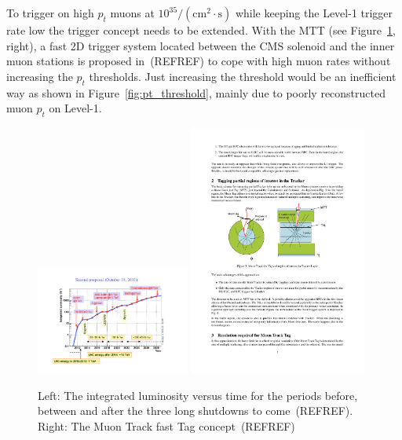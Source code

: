\documentclass[11pt]{amsart}
\begin{document}
To trigger on high $p_t$ muons at $10^{35}/(\mathrm{cm}^2 \cdot\mathrm{s})$ while keeping the Level-1 trigger rate low the trigger concept needs to be extended. With the MTT (see 
Figure~\ref{fig:schedule_concept}, right), a fast 2D trigger system located between the CMS solenoid and the inner muon stations is proposed in~(REFREF) to cope with high 
muon rates without increasing the $p_t$ thresholds. Just increasing the threshold would be an inefficient way as shown in Figure~\ref{fig:pt_threshold}, mainly due to poorly 
reconstructed muon $p_t$ on Level-1. 
\begin{figure}[htbp]
\centering
\includegraphics[width=0.45\textwidth]{Figures/pooth/schedule.pdf}
\includegraphics[width=0.52\textwidth]{Figures/pooth/mtt_concept_a.pdf}
\caption{Left: The integrated luminosity versus time for the periods before, between and after the three long shutdowns to come~(REFREF). Right: The Muon Track fast Tag concept~(REFREF) } 
\label{fig:schedule_concept}
\end{figure}
\end{document}
